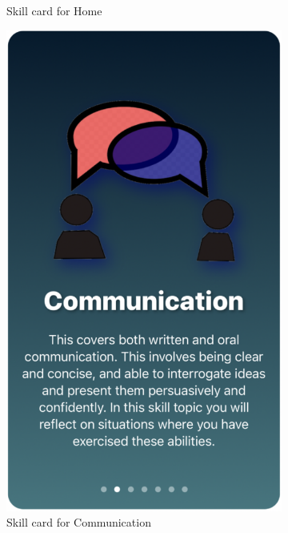 \documentclass{l4proj}
\begin{document}
\begin{appendices}
\begin{figure}[H]
\begin{subfigure}[b]{0.3\textwidth}
        \caption{Skill card for Home}
        \label{fig:HomeCard}
    \end{subfigure}
    \begin{subfigure}[b]{0.3\textwidth}
        \includegraphics[scale=0.25]{images/CommunicationCard.pdf}
        \caption{Skill card for Communication}
        \label{fig:CommunicationCard}
    \end{subfigure}  
    \begin{subfigure}[b]{0.3\textwidth}

\end{subfigure}
\end{figure}
\end{appendices}
\end{document}
